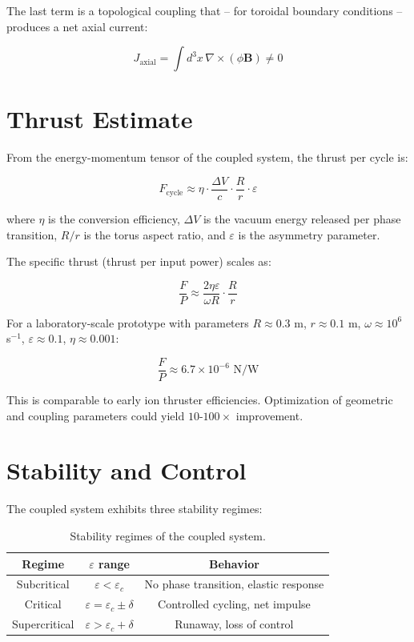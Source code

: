 \documentclass[12pt,a4paper]{article}
\begin{document}
The last term is a topological coupling that -- for toroidal boundary conditions -- produces a net axial current:

\begin{equation}
J_{\text{axial}} = \int d^3x \, \nabla \times (\phi \mathbf{B}) \neq 0
\label{eq:axial}
\end{equation}

\section{Thrust Estimate}

From the energy-momentum tensor of the coupled system, the thrust per cycle is:

\begin{equation}
F_{\text{cycle}} \approx \eta \cdot \frac{\Delta V}{c} \cdot \frac{R}{r} \cdot \varepsilon
\label{eq:thrust}
\end{equation}

where $\eta$ is the conversion efficiency, $\Delta V$ is the vacuum energy released per phase transition, $R/r$ is the torus aspect ratio, and $\varepsilon$ is the asymmetry parameter.

The specific thrust (thrust per input power) scales as:

\begin{equation}
\frac{F}{P} \approx \frac{2\eta\varepsilon}{\omega R} \cdot \frac{R}{r}
\label{eq:specific}
\end{equation}

For a laboratory-scale prototype with parameters $R \approx 0.3$ m, $r \approx 0.1$ m, $\omega \approx 10^6$ s$^{-1}$, $\varepsilon \approx 0.1$, $\eta \approx 0.001$:

\begin{equation}
\frac{F}{P} \approx 6.7 \times 10^{-6} \text{ N/W}
\label{eq:est}
\end{equation}

This is comparable to early ion thruster efficiencies. Optimization of geometric and coupling parameters could yield $10$-$100\times$ improvement.

\section{Stability and Control}

The coupled system exhibits three stability regimes:

\begin{table}[h]
\centering
\begin{tabular}{|c|c|c|}
\hline
\textbf{Regime} & $\varepsilon$ \textbf{range} & \textbf{Behavior} \\
\hline
Subcritical & $\varepsilon < \varepsilon_c$ & No phase transition, elastic response \\
Critical & $\varepsilon = \varepsilon_c \pm \delta$ & Controlled cycling, net impulse \\
Supercritical & $\varepsilon > \varepsilon_c + \delta$ & Runaway, loss of control \\
\hline
\end{tabular}
\caption{Stability regimes of the coupled system.}
\label{tab:stability}
\end{table}
\end{document}
